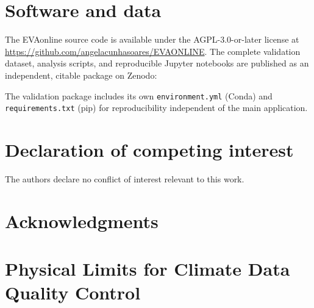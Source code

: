 \documentclass[preprint,review,12pt]{elsarticle}
\begin{document}


\section*{Software and data}
\label{sec:software_data}

The EVAonline source code is available under the AGPL-3.0-or-later license at
\url{https://github.com/angelacunhasoares/EVAONLINE}. The complete validation
dataset, analysis scripts, and reproducible Jupyter notebooks are published as
an independent, citable package on Zenodo:


The validation package includes its own \texttt{environment.yml} (Conda) and
\texttt{requirements.txt} (pip) for reproducibility independent of the main
application.


\section*{Declaration of competing interest}
\label{sec:declaration_competing_interest}

The authors declare no conflict of interest relevant to this work.


\section*{Acknowledgments}
\label{sec:acknowledgments}



\appendix

\section{Physical Limits for Climate Data Quality Control}
\label{app:limits}
\end{document}
